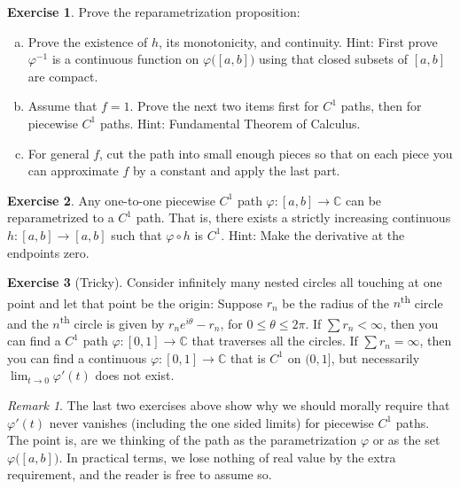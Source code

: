 \documentclass[12pt,openany]{book}
\newcommand{\C}{{\mathbb{C}}}
\theoremstyle{plain}
\theoremstyle{remark}
\newtheorem{remark}[thm]{Remark}
\theoremstyle{definition}
\newenvironment{exbox}{%
    \def\FrameCommand{\vrule width 1pt \relax\hspace {10pt}}%
    \MakeFramed {\advance \hsize -\width \FrameRestore }%
}{%
    \endMakeFramed
}
\newenvironment{exparts}{%
    \leavevmode\begin{enumerate}[a),noitemsep,topsep=0pt,parsep=0pt,partopsep=0pt]
}{%
    \end{enumerate}
}
\theoremstyle{exercise}
\newtheorem{exercise}{Exercise}[section]
\theoremstyle{example}
\begin{document}
\begin{exbox}
\begin{exercise}
Prove the reparametrization proposition:
\begin{exparts}
\item
Prove the existence of $h$, its monotonicity, and continuity.
Hint: First prove $\varphi^{-1}$ is a continuous function on
$\varphi\bigl([a,b]\bigr)$ using that closed subsets of $[a,b]$
are compact.
\item
Assume that $f=1$.  Prove the next two items first for $C^1$ paths,
then for piecewise $C^1$ paths.  Hint: Fundamental Theorem of Calculus.
\item
For general $f$, cut the path into small enough pieces so that
on each piece you can approximate $f$ by a constant and apply the
last part.
\end{exparts}
\end{exercise}

\begin{exercise}
Any one-to-one piecewise $C^1$ path $\varphi \colon [a,b] \to \C$
can be reparametrized
to a $C^1$ path.  That is, there exists a strictly increasing
continuous $h \colon [a,b] \to [a,b]$ such that
$\varphi \circ h$ is $C^1$.  Hint: Make the derivative at the endpoints
zero.
\end{exercise}

\begin{exercise}[Tricky]
Consider infinitely many nested circles all touching at one point
and let that point be the origin: Suppose $r_n$ be the radius of the
$n$\textsuperscript{th}
circle and the $n$\textsuperscript{th} circle is given by $r_n e^{i\theta} - r_n$, for $0 \leq
\theta \leq 2\pi$.  If $\sum r_n < \infty$, then you can find a $C^1$ path $\varphi \colon
[0,1] \to \C$ that traverses all the circles.  If $\sum r_n = \infty$, then
you can find a continuous $\varphi \colon [0,1] \to \C$ that is $C^1$ on
$(0,1]$, but necessarily $\lim_{t \to 0} \varphi'(t)$ does not exist.
\end{exercise}
\end{exbox}

\begin{remark}
The last two exercises above show why we should morally
require that $\varphi'(t)$ never vanishes (including the one sided limits)
for piecewise $C^1$ paths.  The point is, are we thinking of the path
as the parametrization $\varphi$ or as the set $\varphi\bigl([a,b]\bigr)$.
In practical terms, we lose nothing of real value by the extra requirement,
and the reader is free to assume so.
\end{remark}
\end{document}
